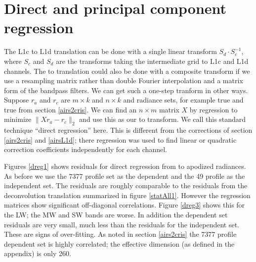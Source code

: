 \documentclass[10pt,twocolumn]{article}
\begin{document}
\section{Direct and principal component regression}
\label{dregr}

The {\airs} L1c to L1d translation can be done with a single 
linear transform $S_d\cdot S_c^{-1}$, where $S_c$ and $S_d$ are the
transforms taking the intermediate grid to L1c and L1d channels.
The {\airs} to {\cris} translation could also be done with a
composite transform if we use a resampling matrix rather than
double Fourier interpolation and a matrix form of the bandpass
filters.  We can get such a one-step tranform in other ways.
Suppose $r_a$ and $r_c$ are $m \times k$ and $n \times k$ {\airs}
and {\cris} radiance sets, for example true {\airs} and true {\cris}
from section \ref{airs2cris}.  We can find an $n \times m$ matrix
$X$ by regression to minimize $\|X r_a - r_c\|_2$ and use this as
our {\airs} to {\cris} transform.  We call this standard technique
``direct regression'' here.  This is different from the corrections
of section \ref{airs2cris} and \ref{airsL1d}; there regression was
used to find linear or quadratic correction coefficients
independently for each channel.


Figures \ref{dreg1} shows residuals for direct regression from
{\airs} to apodized {\cris} radiances.  As before we use the 7377
profile set as the dependent and the 49 profile as the independent
set.  The residuals are roughly comparable to the residuals from
the deconvolution translation summarized in figure \ref{statAll1}.
However the regression matrices show significant off-diagonal
correlations.  Figure \ref{dreg3} shows this for the LW; the MW and
SW bands are worse.  In addition the dependent set residuals are
very small, much less than the residuals for the independent set.
These are signs of over-fitting.  As noted in section \ref{airs2cris}
the 7377 profile dependent set is highly correlated; the effective
dimension (as defined in the appendix) is only 260.

\end{document}

